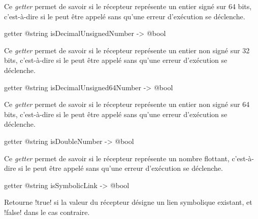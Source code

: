 Ce \emph{getter} permet de savoir si le récepteur représente un entier signé sur 64 bits, c'est-à-dire si le  peut être appelé sans qu'une erreur d'exécution se déclenche.







\begin{galgas3box}
getter @string isDecimalUnsignedNumber -> @bool
\end{galgas3box}

Ce \emph{getter} permet de savoir si le récepteur représente un entier non signé sur 32 bits, c'est-à-dire si le  peut être appelé sans qu'une erreur d'exécution se déclenche.







\begin{galgas3box}
getter @string isDecimalUnsigned64Number -> @bool
\end{galgas3box}

Ce \emph{getter} permet de savoir si le récepteur représente un entier non signé sur 64 bits, c'est-à-dire si le  peut être appelé sans qu'une erreur d'exécution se déclenche.







\begin{galgas3box}
getter @string isDoubleNumber -> @bool
\end{galgas3box}

Ce \emph{getter} permet de savoir si le récepteur représente un nombre flottant, c'est-à-dire si le  peut être appelé sans qu'une erreur d'exécution se déclenche.








\begin{galgas3box}
getter @string isSymbolicLink -> @bool
\end{galgas3box}

Retourne \ggst!true! si la valeur du récepteur désigne un lien symbolique existant, et \ggst!false! dans le cas contraire.








